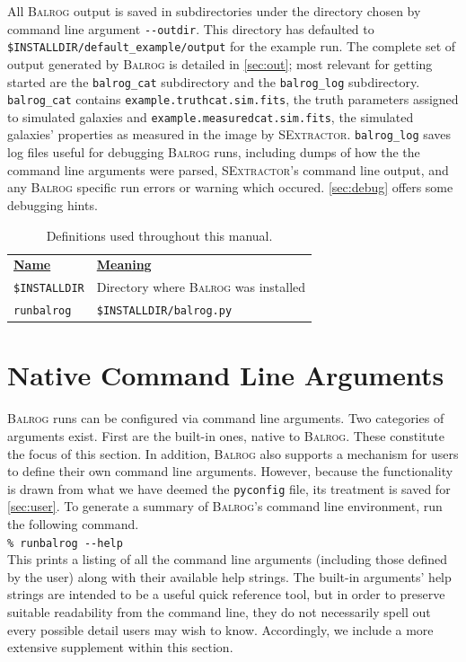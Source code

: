 \documentclass[12pt]{book}
\newcommand{\pyconfig}{\texttt{pyconfig}}
\newcommand{\balrog}{\textsc{Balrog}}
\newcommand{\sex}{\textsc{SExtractor}}
\newcommand{\opt}[1]{{\texttt{-}\texttt{-#1}}}
\newcommand{\inline}{\\[0.4cm]}
\newcommand{\bcmd}[1]{\texttt{\% runbalrog #1}}
\begin{document}
All \balrog{} output is saved in subdirectories under the directory chosen by command line argument \opt{outdir}.
This directory has defaulted to \texttt{\$INSTALLDIR/default\_example/output} for the example run.
The complete set of output generated by \balrog{} is detailed in \autoref{sec:out};
most relevant for getting started are the \texttt{balrog\_cat} subdirectory and the \texttt{balrog\_log} subdirectory.
\texttt{balrog\_cat} contains \texttt{example.truthcat.sim.fits}, the truth parameters assigned to simulated galaxies
and \texttt{example.measuredcat.sim.fits}, the simulated galaxies' properties as measured in the image by \sex{}.
\texttt{balrog\_log} saves log files useful for debugging \balrog{} runs, including dumps of how the the command line
arguments were parsed, \sex{}'s command line output, and any \balrog{} specific run errors or warning which occured.
\autoref{sec:debug} offers some debugging hints.


\begin{table}[h]
\caption{Definitions used throughout this manual.}
\label{tab:def}
\begin{tabular}{l l}
\underline{\textbf{Name}} & \underline{\textbf{Meaning}} \\
\texttt{\$INSTALLDIR} & Directory where \balrog{} was installed \\
\texttt{runbalrog} & \texttt{\$INSTALLDIR/balrog.py} \\
\end{tabular}
\end{table}


\chapter{Native Command Line Arguments}
\label{sec:cmdline}

\balrog{} runs can be configured via command line arguments.
Two categories of arguments exist. 
First are the built-in ones, native to \balrog{}.
These constitute the focus of this section.
In addition, \balrog{} also supports a mechanism for users to define their own command line arguments.
However, because the functionality is drawn from what we have deemed the \pyconfig{} file,
its treatment is saved for \autoref{sec:user}.
To generate a summary of \balrog{}'s command line environment, run the following command.
\inline
\bcmd{\opt{help}}
\inline
This prints a listing of all the command line arguments (including those defined by the user) 
along with their available help strings.
The built-in arguments' help strings are intended to be a useful quick reference tool,
but in order to preserve suitable readability from the command line, 
they do not necessarily spell out every possible detail users may wish to know.
Accordingly, we include a more extensive supplement within this section.
\end{document}
